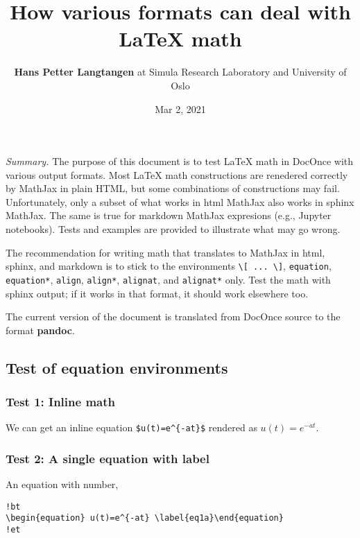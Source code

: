 \documentclass[]{article}
\title{How various formats can deal with LaTeX math}
\author{\textbf{Hans Petter Langtangen} at Simula Research Laboratory and
University of Oslo}
\date{Mar 2, 2021}
\begin{document}
\maketitle

\emph{Summary.} The purpose of this document is to test LaTeX math in
DocOnce with various output formats. Most LaTeX math constructions are
renedered correctly by MathJax in plain HTML, but some combinations of
constructions may fail. Unfortunately, only a subset of what works in
html MathJax also works in sphinx MathJax. The same is true for markdown
MathJax expresions (e.g., Jupyter notebooks). Tests and examples are
provided to illustrate what may go wrong.

The recommendation for writing math that translates to MathJax in html,
sphinx, and markdown is to stick to the environments
\texttt{\textbackslash{}{[}\ ...\ \textbackslash{}{]}},
\texttt{equation}, \texttt{equation*}, \texttt{align}, \texttt{align*},
\texttt{alignat}, and \texttt{alignat*} only. Test the math with sphinx
output; if it works in that format, it should work elsewhere too.

The current version of the document is translated from DocOnce source to
the format \textbf{pandoc}.

\subsection{Test of equation
environments}\label{test-of-equation-environments}

\subsubsection{Test 1: Inline math}\label{test-1-inline-math}

We can get an inline equation \texttt{\$u(t)=e\^{}\{-at\}\$} rendered as
\(u(t)=e^{-at}\).

\subsubsection{Test 2: A single equation with
label}\label{test-2-a-single-equation-with-label}

An equation with number,

\begin{verbatim}
!bt
\begin{equation} u(t)=e^{-at} \label{eq1a}\end{equation}
!et
\end{verbatim}
\end{document}
